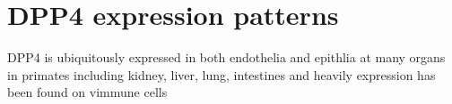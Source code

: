 \section{DPP4 expression patterns}
DPP4 is ubiquitously expressed in both endothelia and epithlia at many organs in primates including kidney, liver, lung, intestines and heavily expression has been found on vimmune cells